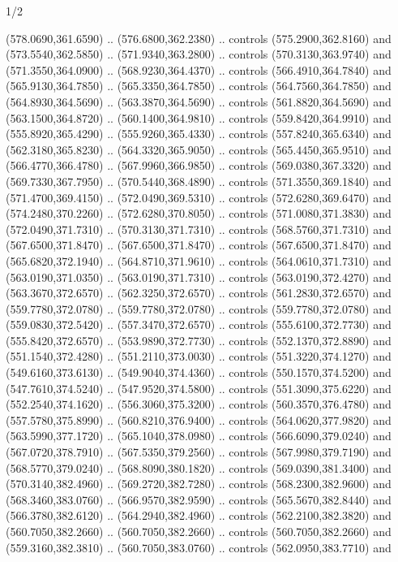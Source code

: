 \begin{flagdescription}{1/2}
\begin{scope}[xshift=0.5\flaglength,yshift=0.5\flagwidth,scale=\flagwidth/759]
\begin{scope}[y=0.8pt, x=0.8pt, yscale=-1,shift={(-720,-480)}]
\begin{scope}[cm={{1.14637,0.0,0.0,1.17117,(33.17849,82.1384)}}]
  (578.0690,361.6590) .. (576.6800,362.2380) .. controls (575.2900,362.8160) and
  (573.5540,362.5850) .. (571.9340,363.2800) .. controls (570.3130,363.9740) and
  (571.3550,364.0900) .. (568.9230,364.4370) .. controls (566.4910,364.7840) and
  (565.9130,364.7850) .. (565.3350,364.7850) .. controls (564.7560,364.7850) and
  (564.8930,364.5690) .. (563.3870,364.5690) .. controls (561.8820,364.5690) and
  (563.1500,364.8720) .. (560.1400,364.9810) .. controls (559.8420,364.9910) and
  (555.8920,365.4290) .. (555.9260,365.4330) .. controls (557.8240,365.6340) and
  (562.3180,365.8230) .. (564.3320,365.9050) .. controls (565.4450,365.9510) and
  (566.4770,366.4780) .. (567.9960,366.9850) .. controls (569.0380,367.3320) and
  (569.7330,367.7950) .. (570.5440,368.4890) .. controls (571.3550,369.1840) and
  (571.4700,369.4150) .. (572.0490,369.5310) .. controls (572.6280,369.6470) and
  (574.2480,370.2260) .. (572.6280,370.8050) .. controls (571.0080,371.3830) and
  (572.0490,371.7310) .. (570.3130,371.7310) .. controls (568.5760,371.7310) and
  (567.6500,371.8470) .. (567.6500,371.8470) .. controls (567.6500,371.8470) and
  (565.6820,372.1940) .. (564.8710,371.9610) .. controls (564.0610,371.7310) and
  (563.0190,371.0350) .. (563.0190,371.7310) .. controls (563.0190,372.4270) and
  (563.3670,372.6570) .. (562.3250,372.6570) .. controls (561.2830,372.6570) and
  (559.7780,372.0780) .. (559.7780,372.0780) .. controls (559.7780,372.0780) and
  (559.0830,372.5420) .. (557.3470,372.6570) .. controls (555.6100,372.7730) and
  (555.8420,372.6570) .. (553.9890,372.7730) .. controls (552.1370,372.8890) and
  (551.1540,372.4280) .. (551.2110,373.0030) .. controls (551.3220,374.1270) and
  (549.6160,373.6130) .. (549.9040,374.4360) .. controls (550.1570,374.5200) and
  (547.7610,374.5240) .. (547.9520,374.5800) .. controls (551.3090,375.6220) and
  (552.2540,374.1620) .. (556.3060,375.3200) .. controls (560.3570,376.4780) and
  (557.5780,375.8990) .. (560.8210,376.9400) .. controls (564.0620,377.9820) and
  (563.5990,377.1720) .. (565.1040,378.0980) .. controls (566.6090,379.0240) and
  (567.0720,378.7910) .. (567.5350,379.2560) .. controls (567.9980,379.7190) and
  (568.5770,379.0240) .. (568.8090,380.1820) .. controls (569.0390,381.3400) and
  (570.3140,382.4960) .. (569.2720,382.7280) .. controls (568.2300,382.9600) and
  (568.3460,383.0760) .. (566.9570,382.9590) .. controls (565.5670,382.8440) and
  (566.3780,382.6120) .. (564.2940,382.4960) .. controls (562.2100,382.3820) and
  (560.7050,382.2660) .. (560.7050,382.2660) .. controls (560.7050,382.2660) and
  (559.3160,382.3810) .. (560.7050,383.0760) .. controls (562.0950,383.7710) and

\end{scope}
\end{scope}
\end{scope}
\end{flagdescription}
